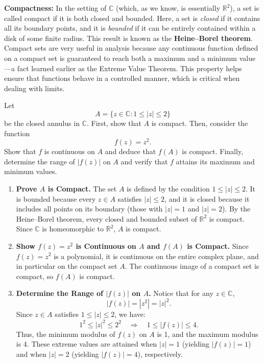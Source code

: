 \noindent \textbf{Compactness:}  In the setting of \(\mathbb{C}\) (which, as we know, is essentially \(\mathbb{R}^2\)), a set is called compact if it is both closed and bounded. Here, a set is \emph{closed} if it contains all its boundary points, and it is \emph{bounded} if it can be entirely contained within a disk of some finite radius. This result is known as the \textbf{Heine–Borel theorem}. Compact sets are very useful in analysis because any continuous function defined on a compact set is guaranteed to reach both a maximum and a minimum value—a fact learned earlier as the Extreme Value Theorem. This property helps ensure that functions behave in a controlled manner, which is critical when dealing with limits.
\exampleline
\begin{example}
Let 
\[
A = \{ z \in \mathbb{C} : 1 \leq |z| \leq 2 \}
\]
be the closed annulus in \(\mathbb{C}\). First, show that \(A\) is compact. Then, consider the function 
\[
f(z) = z^2.
\]
Show that \(f\) is continuous on \(A\) and deduce that \(f(A)\) is compact. Finally, determine the range of \(|f(z)|\) on \(A\) and verify that \(f\) attains its maximum and minimum values.

\begin{solution}
\begin{enumerate}
\item \textbf{Prove \(A\) is Compact.}
The set \(A\) is defined by the condition \(1 \leq |z| \leq 2\). It is bounded because every \(z \in A\) satisfies \(|z| \leq 2\), and it is closed because it includes all points on its boundary (those with \(|z|=1\) and \(|z|=2\)). By the Heine–Borel theorem, every closed and bounded subset of \(\mathbb{R}^2\) is compact. Since \(\mathbb{C}\) is homeomorphic to \(\mathbb{R}^2\), \(A\) is compact.

\item \textbf{Show \(f(z) = z^2\) is Continuous on \(A\) and \(f(A)\) is Compact.}
Since \(f(z)=z^2\) is a polynomial, it is continuous on the entire complex plane, and in particular on the compact set \(A\). The continuous image of a compact set is compact, so \(f(A)\) is compact.

\item \textbf{Determine the Range of \(|f(z)|\) on \(A\).}
Notice that for any \(z \in \mathbb{C}\),
\[
|f(z)| = |z^2| = |z|^2.
\]
Since \(z \in A\) satisfies \(1 \leq |z| \leq 2\), we have:
\[
1^2 \leq |z|^2 \leq 2^2 \quad \Longrightarrow \quad 1 \leq |f(z)| \leq 4.
\]
Thus, the minimum modulus of \(f(z)\) on \(A\) is 1, and the maximum modulus is 4. These extreme values are attained when \(|z| = 1\) (yielding \(|f(z)| = 1\)) and when \(|z| = 2\) (yielding \(|f(z)| = 4\)), respectively.


\end{enumerate}
\end{solution}
\end{example}
